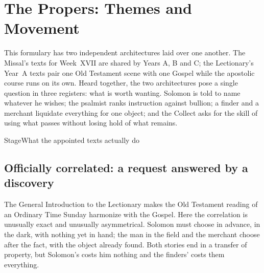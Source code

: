 \section*{The Propers: Themes and Movement}
\label{triptych:brief-synthesis:start}

This formulary has two independent architectures laid over one another. The Missal's texts for Week~XVII are shared by Years A, B and C; the Lectionary's Year~A texts pair one Old Testament scene with one Gospel while the apostolic course runs on its own. Heard together, the two architectures pose a single question in three registers: what is worth wanting. Solomon is told to name whatever he wishes; the psalmist ranks instruction against bullion; a finder and a merchant liquidate everything for one object; and the Collect asks for the skill of using what passes without losing hold of what remains.

\begin{twocoltable}{Stage}{What the appointed texts actually do}
\end{twocoltable}

\subsection*{Officially correlated: a request answered by a discovery}

The General Introduction to the Lectionary makes the Old Testament reading of an Ordinary Time Sunday harmonize with the Gospel. Here the correlation is unusually exact and unusually asymmetrical. Solomon must choose in advance, in the dark, with nothing yet in hand; the man in the field and the merchant choose after the fact, with the object already found. Both stories end in a transfer of property, but Solomon's costs him nothing and the finders' costs them everything.

